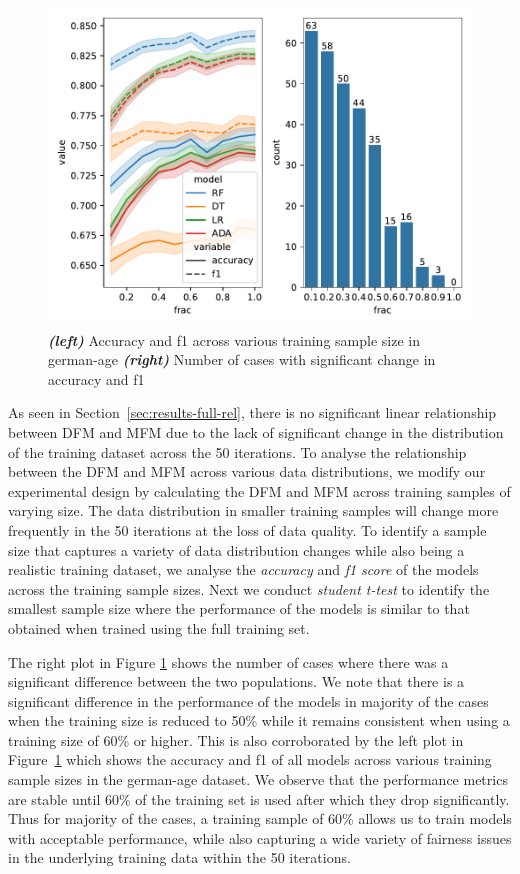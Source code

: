 \documentclass{article}
\begin{document}
\begin{figure}
  \centering
  \includegraphics[width=0.95\linewidth]{training-set-frac-threshold.pdf}
  \caption{\emph{\textbf{(left)}} Accuracy and f1 across various
    training sample size in german-age \emph{\textbf{(right)}} Number
    of cases with significant change in accuracy and f1}
  \label{fig:training-set-frac-threshold}
\end{figure}

As seen in Section \ref{sec:results-full-rel}, there is no significant
linear relationship between DFM and MFM due to the lack of significant
change in the distribution of the training dataset across the 50
iterations. To analyse the relationship between the DFM and MFM across
various data distributions, we modify our experimental design by
calculating the DFM and MFM across training samples of varying size.
The data distribution in smaller training samples will change more
frequently in the 50 iterations at the loss of data quality. To
identify a sample size that captures a variety of data distribution
changes while also being a realistic training dataset, we analyse the
\emph{accuracy} and \emph{f1 score} of the models across the training
sample sizes. Next we conduct \emph{student t-test} to identify the
smallest sample size where the performance of the models is similar to
that obtained when trained using the full training set.

The right plot in Figure \ref{fig:training-set-frac-threshold} shows
the number of cases where there was a significant difference between
the two populations. We note that there is a significant difference in
the performance of the models in majority of the cases when the
training size is reduced to 50\% while it remains consistent when
using a training size of 60\% or higher. This is also corroborated by
the left plot in Figure \ref{fig:training-set-frac-threshold} which
shows the accuracy and f1 of all models across various training sample
sizes in the german-age dataset. We observe that the performance
metrics are stable until 60\% of the training set is used after which
they drop significantly. Thus for majority of the cases, a training
sample of 60\% allows us to train models with acceptable performance,
while also capturing a wide variety of fairness issues in the
underlying training data within the 50 iterations.
\end{document}
